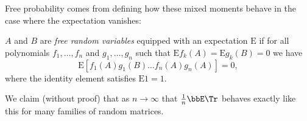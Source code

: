 Free probability comes from defining how these mixed moments behave in the case where the expectation vanishes:

\begin{definition} $A$ and $B$ are \emph{free random variables} equipped with an expectation $\ensuremath{\bm{\mathrm{E}}}$ if for all polynomials $f_1,\ensuremath{\ldots},f_n$ and $g_1,\ensuremath{\ldots},g_n$ such that $\ensuremath{\bm{\mathrm{E}}} f_k(A) = \ensuremath{\bm{\mathrm{E}}} g_k(B) = 0$ we have
\[
\ensuremath{\bm{\mathrm{E}}}[f_1(A) g_1(B) \ensuremath{\ldots} f_n(A) g_n(A)] = 0,
\]
where the identity element satisfies $\ensuremath{\bm{\mathrm{E}}} 1 = 1$. \end{definition}

We claim (without proof) that as $n \ensuremath{\rightarrow} \ensuremath{\infty}$ that ${1 \over n} \ensuremath{\bbE} \Tr$ behaves exactly like this for many families of random matrices. 

